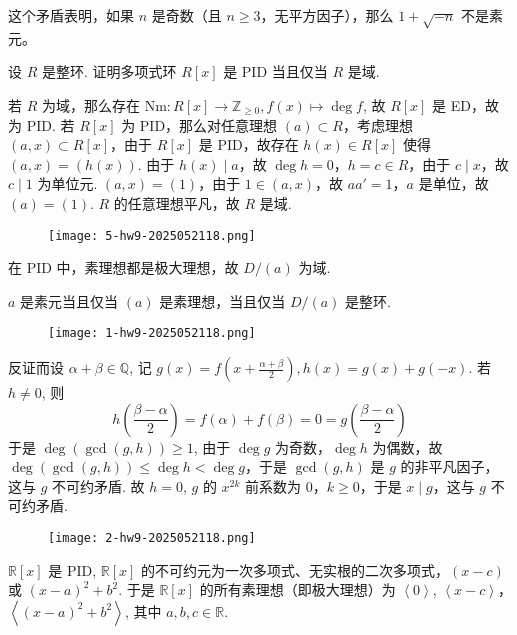 这个矛盾表明，如果 $n$ 是奇数（且 $n \geq 3$，无平方因子），那么 $1+\sqrt{-n}$ 不是素元。

\begin{exercise}
设 $R$ 是整环. 证明多项式环 $R[x]$ 是 PID 当且仅当 $R$ 是域.
\end{exercise}
若 $R$ 为域，那么存在 $\mathrm{Nm}:R[x]\to \mathbb{Z}_{\geq0},f(x)\mapsto \deg f$, 故 $R[x]$ 是 ED，故为 PID. 若 $R[x]$ 为 PID，那么对任意理想 $(a)\subset R$，考虑理想 $(a,x)\subset R[x]$，由于 $R[x]$ 是 PID，故存在 $h (x)\in R[x]$ 使得 $(a,x)=(h(x))$. 由于 $h(x)\mid a$，故 $\deg h=0$，$h=c\in R$，由于 $c\mid x$，故 $c\mid1$ 为单位元. $(a,x)=(1)$，由于 $1\in(a,x)$，故 $aa'=1$，$a$ 是单位，故 $(a)=(1)$. $R$ 的任意理想平凡，故 $R$ 是域.

\begin{exercise}
\begin{figure}[H]
\centering
\texttt{[image: 5-hw9-2025052118.png]}
\label{}
\end{figure}
\end{exercise}
在 PID 中，素理想都是极大理想，故 $D/(a)$ 为域.

$a$ 是素元当且仅当 $(a)$ 是素理想，当且仅当 $D/(a)$ 是整环.

\begin{exercise}
\begin{figure}[H]
\centering
\texttt{[image: 1-hw9-2025052118.png]}
\label{}
\end{figure}
\end{exercise}
反证而设 $\alpha+\beta\in \mathbb{Q}$, 记 $g(x)=f\left( x+\frac{\alpha+\beta}{2} \right),h(x)=g(x)+g(-x)$. 若 $h\neq0$, 则
\[
h\left( \frac{\beta-\alpha}{2} \right)=f(\alpha)+f(\beta)=0=g\left( \frac{\beta-\alpha}{2} \right)
\]
于是 $\deg(\gcd(g,h))\geq1$, 由于 $\deg g$ 为奇数，$\deg h$ 为偶数，故 $\deg(\gcd(g,h))\leq \deg h<\deg g$，于是 $\gcd(g,h)$ 是 $g$ 的非平凡因子，这与 $g$ 不可约矛盾. 故 $h=0$, $g$ 的 $x^{2k}$ 前系数为 0，$k\geq0$，于是 $x\mid g$，这与 $g$ 不可约矛盾.

\begin{exercise}
\begin{figure}[H]
\centering
\texttt{[image: 2-hw9-2025052118.png]}
\label{}
\end{figure}
\end{exercise}
$\mathbb{R}[x]$ 是 PID, $\mathbb{R}[x]$ 的不可约元为一次多项式、无实根的二次多项式，$(x-c)$ 或 $(x-a)^2+b^2$. 于是 $\mathbb{R}[x]$ 的所有素理想（即极大理想）为 $\left< 0 \right>$, $\left< x-c \right>$，$\left< (x-a)^2+b^2 \right>$, 其中 $a, b, c\in \mathbb{R}$.

